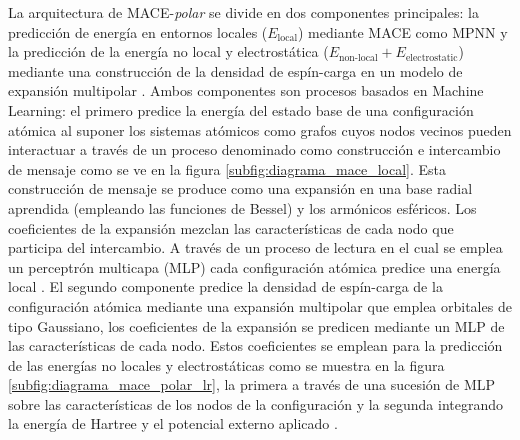 \documentclass[12pt]{article}
\begin{document}
La arquitectura de MACE-\textit{polar} se divide en dos componentes principales: la predicción de energía en entornos locales ($E_{\text{local}}$) mediante MACE como MPNN \cite{batatia2023mace} y la predicción de la energía no local y electrostática ($E_{\text{non-local}} + E_{\text{electrostatic}}$) mediante una construcción de la densidad de espín-carga en un modelo de expansión multipolar \cite{batatia2026macepolar}. Ambos componentes son procesos basados en Machine Learning: el primero predice la energía del estado base de una configuración atómica al suponer los sistemas atómicos como grafos cuyos nodos vecinos pueden interactuar a través de un proceso denominado como construcción e intercambio de mensaje como se ve en la figura \ref{subfig:diagrama_mace_local}. Esta construcción de mensaje se produce como una expansión en una base radial aprendida (empleando las funciones de Bessel) y los armónicos esféricos. Los coeficientes de la expansión mezclan las características de cada nodo que participa del intercambio. A través de un proceso de lectura en el cual se emplea un perceptrón multicapa (MLP) cada configuración atómica predice una energía local \cite{batatia2023mace}. El segundo componente predice la densidad de espín-carga de la configuración atómica mediante una expansión multipolar que emplea orbitales de tipo Gaussiano, los coeficientes de la expansión se predicen mediante un MLP de las características de cada nodo. Estos coeficientes se emplean para la predicción de las energías no locales y electrostáticas como se muestra en la figura \ref{subfig:diagrama_mace_polar_lr}, la primera a través de una sucesión de MLP sobre las características de los nodos de la configuración y la segunda integrando la energía de Hartree y el potencial externo aplicado \cite{batatia2026macepolar}.
\end{document}
